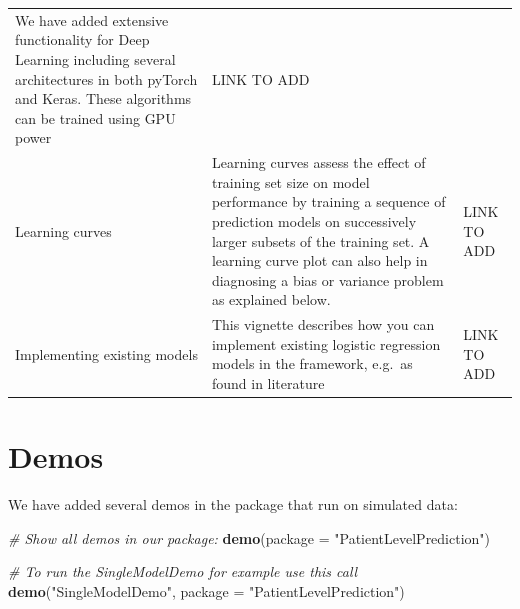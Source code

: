 \documentclass[]{article}
\newenvironment{Shaded}{\begin{snugshade}}{\end{snugshade}}
\newcommand{\KeywordTok}[1]{\textcolor[rgb]{0.13,0.29,0.53}{\textbf{#1}}}
\newcommand{\DataTypeTok}[1]{\textcolor[rgb]{0.13,0.29,0.53}{#1}}
\newcommand{\StringTok}[1]{\textcolor[rgb]{0.31,0.60,0.02}{#1}}
\newcommand{\CommentTok}[1]{\textcolor[rgb]{0.56,0.35,0.01}{\textit{#1}}}
\newcommand{\NormalTok}[1]{#1}
\begin{document}
\begin{longtable}[]{@{}lll@{}}
\begin{minipage}[t]{0.54\columnwidth}
We have added extensive functionality for Deep Learning including
several architectures in both pyTorch and Keras. These algorithms can be
trained using GPU power\strut
\end{minipage} & \begin{minipage}[t]{0.19\columnwidth}\raggedright\strut
LINK TO ADD\strut
\end{minipage}\tabularnewline
\begin{minipage}[t]{0.19\columnwidth}\raggedright\strut
Learning curves\strut
\end{minipage} & \begin{minipage}[t]{0.54\columnwidth}\raggedright\strut
Learning curves assess the effect of training set size on model
performance by training a sequence of prediction models on successively
larger subsets of the training set. A learning curve plot can also help
in diagnosing a bias or variance problem as explained below.\strut
\end{minipage} & \begin{minipage}[t]{0.19\columnwidth}\raggedright\strut
LINK TO ADD\strut
\end{minipage}\tabularnewline
\begin{minipage}[t]{0.19\columnwidth}\raggedright\strut
Implementing existing models\strut
\end{minipage} & \begin{minipage}[t]{0.54\columnwidth}\raggedright\strut
This vignette describes how you can implement existing logistic
regression models in the framework, e.g.~as found in literature\strut
\end{minipage} & \begin{minipage}[t]{0.19\columnwidth}\raggedright\strut
LINK TO ADD\strut
\end{minipage}\tabularnewline
\bottomrule
\end{longtable}

\section{Demos}\label{demos}

We have added several demos in the package that run on simulated data:

\begin{Shaded}
\begin{Highlighting}[]
\CommentTok{# Show all demos in our package: }
 \KeywordTok{demo}\NormalTok{(}\DataTypeTok{package =} \StringTok{"PatientLevelPrediction"}\NormalTok{)}

\CommentTok{# To run the SingleModelDemo for example use this call}
 \KeywordTok{demo}\NormalTok{(}\StringTok{"SingleModelDemo"}\NormalTok{, }\DataTypeTok{package =} \StringTok{"PatientLevelPrediction"}\NormalTok{)}
\end{Highlighting}
\end{Shaded}
\end{document}
